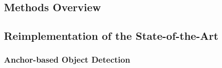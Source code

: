 
\subsection{Methods Overview}



\subsection{Reimplementation of the State-of-the-Art}

\subsubsection{Anchor-based Object Detection}




